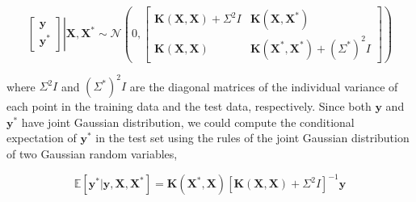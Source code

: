 \begin{spacing}{2.0}
    \begin{equation}
        \left.\begin{bmatrix}
            \mathbf{y} \\ \mathbf{y}^*
        \end{bmatrix}\right|\mathbf{X},\mathbf{X}^* \sim \mathcal{N}\left(0,
            \begin{bmatrix}
                \mathbf{K}(\mathbf{X},\mathbf{X}) + \Sigma^2 I & \mathbf{K}(\mathbf{X},\mathbf{X}^*) \\
                \mathbf{K}(\mathbf{X},\mathbf{X}) & \mathbf{K}(\mathbf{X}^*,\mathbf{X}^*) + (\Sigma^*)^2 I
            \end{bmatrix}
        \right)
        \label{eq:gpr-distribution-gaussian-process-y}
    \end{equation}

    \noindent where $\Sigma^2 I$ and $(\Sigma^*)^2 I$ are the diagonal matrices of the individual variance of each point in the training data and the test data, 
    respectively. Since both $\mathbf{y}$ and $\mathbf{y}^*$ have joint Gaussian distribution, we could compute the conditional expectation of $\mathbf{y}^*$ in 
    the test set using the rules of the joint Gaussian distribution of two Gaussian random variables, \cite{W-Stanford-GPR} 

    \begin{equation}
        \mathbb{E}\left[\mathbf{y}^*|\mathbf{y},\mathbf{X},\mathbf{X}^*\right] = \mathbf{K}(\mathbf{X}^*,\mathbf{X})
            \left[\mathbf{K}(\mathbf{X},\mathbf{X}) + \Sigma^2 I\right]^{-1}\mathbf{y}
        \label{eq:gpr-expectation}
    \end{equation}
\end{spacing}
